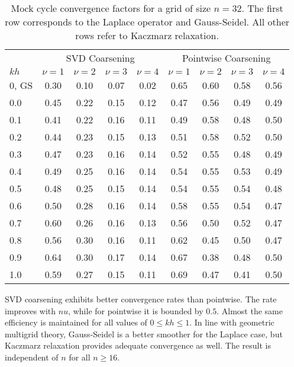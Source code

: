 \documentclass{article}
\begin{document}
\begin{table}
\begin{tabular}{l|cccc|cccc}
\toprule
& \multicolumn{4}{c|}{SVD Coarsening} & \multicolumn{4}{|c}{Pointwise Coarsening} \\
$kh$ &  $\nu=1$ &  $\nu=2$ &  $\nu=3$ &  $\nu=4$ &  $\nu=1$ &  $\nu=2$ &  $\nu=3$ &  $\nu=4$ \\
\midrule
0, GS &       0.30 &       0.10 &       0.07 &       0.02 &      0.65 &      0.60 &      0.58 &      0.56 \\
0.0      &       0.45 &       0.22 &       0.15 &       0.12 &      0.47 &      0.56 &      0.49 &      0.49 \\
0.1      &       0.41 &       0.22 &       0.16 &       0.11 &      0.49 &      0.58 &      0.48 &      0.50 \\
0.2      &       0.44 &       0.23 &       0.15 &       0.13 &      0.51 &      0.58 &      0.52 &      0.50 \\
0.3      &       0.47 &       0.23 &       0.16 &       0.14 &      0.52 &      0.55 &      0.48 &      0.49 \\
0.4      &       0.49 &       0.25 &       0.16 &       0.14 &      0.54 &      0.55 &      0.53 &      0.49 \\
0.5      &       0.48 &       0.25 &       0.15 &       0.14 &      0.54 &      0.55 &      0.54 &      0.48 \\
0.6      &       0.50 &       0.28 &       0.16 &       0.14 &      0.58 &      0.55 &      0.54 &      0.47 \\
0.7      &       0.60 &       0.26 &       0.16 &       0.13 &      0.56 &      0.50 &      0.52 &      0.47 \\
0.8      &       0.56 &       0.30 &       0.16 &       0.11 &      0.62 &      0.45 &      0.50 &      0.47 \\
0.9      &       0.64 &       0.30 &       0.17 &       0.14 &      0.67 &      0.38 &      0.48 &      0.50 \\
1.0      &       0.59 &       0.27 &       0.15 &       0.11 &      0.69 &      0.47 &      0.41 &      0.50 \\\bottomrule
\end{tabular}
\caption{Mock cycle convergence factors for a grid of size $n=32$. The first row corresponds to the Laplace operator and Gauss-Seidel. All other rows refer to Kaczmarz relaxation.}
\end{table}

SVD coarsening exhibits better convergence rates than pointwise. The rate improves with $nu$, while for pointwise it is bounded by $0.5$.  Almost the same efficiency is maintained for all values of $0 \leq kh \leq 1$. In line with geometric multigrid theory, Gauss-Seidel is a better smoother for the Laplace case, but Kaczmarz relaxation provides adequate convergence as well. The result is independent of $n$ for all $n \geq 16$.
\end{document}
